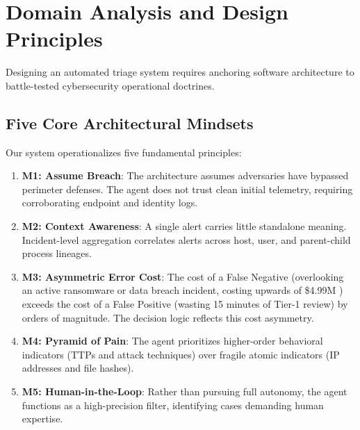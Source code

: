 \section{Domain Analysis and Design Principles}

Designing an automated triage system requires anchoring software architecture to battle-tested cybersecurity operational doctrines.

\subsection{Five Core Architectural Mindsets}
Our system operationalizes five fundamental principles:
\begin{enumerate}
    \item \textbf{M1: Assume Breach}: The architecture assumes adversaries have bypassed perimeter defenses. The agent does not trust clean initial telemetry, requiring corroborating endpoint and identity logs.
    \item \textbf{M2: Context Awareness}: A single alert carries little standalone meaning. Incident-level aggregation correlates alerts across host, user, and parent-child process lineages.
    \item \textbf{M3: Asymmetric Error Cost}: The cost of a False Negative (overlooking an active ransomware or data breach incident, costing upwards of \$4.99M \cite{ibm2026databreach}) exceeds the cost of a False Positive (wasting 15 minutes of Tier-1 review) by orders of magnitude. The decision logic reflects this cost asymmetry.
    \item \textbf{M4: Pyramid of Pain}: The agent prioritizes higher-order behavioral indicators (TTPs and attack techniques) over fragile atomic indicators (IP addresses and file hashes).
    \item \textbf{M5: Human-in-the-Loop}: Rather than pursuing full autonomy, the agent functions as a high-precision filter, identifying cases demanding human expertise.
\end{enumerate}

